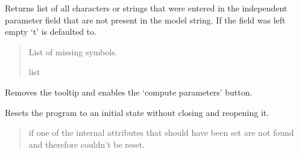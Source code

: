 \documentclass[letterpaper,10pt,english]{sphinxmanual}
\begin{document}
\begin{fulllineitems}
\begin{fulllineitems}
\begin{quote}
\begin{description}
\end{description}\end{quote}

\end{fulllineitems}


\begin{fulllineitems}
\label{\detokenize{CTkInterface:src.CTkInterface.MainApp.missing_independent_variables}}
\pysigstartsignatures
{}
\pysigstopsignatures
\sphinxAtStartPar
Returns list of all characters or strings that were entered in the independent
parameter field that are not present in the model string.
If the field was left empty ‘t’ is defaulted to.
\begin{quote}\begin{description}
\sphinxAtStartPar
List of missing symbols.

\sphinxAtStartPar
list

\end{description}\end{quote}

\end{fulllineitems}


\begin{fulllineitems}
\label{\detokenize{CTkInterface:src.CTkInterface.MainApp.remove_compute_tooltip}}
\pysigstartsignatures
{}
\pysigstopsignatures
\sphinxAtStartPar
Removes the tooltip and enables the ‘compute parameters’ button.

\end{fulllineitems}


\begin{fulllineitems}
\label{\detokenize{CTkInterface:src.CTkInterface.MainApp.reset_state}}
\pysigstartsignatures
{}
\pysigstopsignatures
\sphinxAtStartPar
Resets the program to an initial state without closing and reopening it.
\begin{quote}\begin{description}
\sphinxAtStartPar
{} \textendash{} if one of the internal attributes that should have been set are        not found and therefore couldn’t be reset.


\end{description}
\end{quote}
\end{fulllineitems}
\end{fulllineitems}
\end{document}
